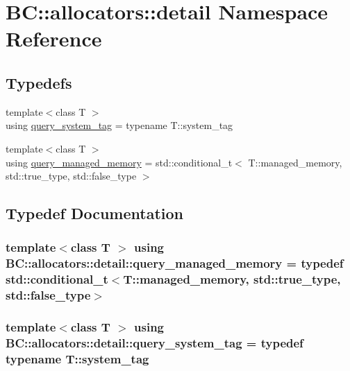 \hypertarget{namespaceBC_1_1allocators_1_1detail}{}\section{BC\+:\+:allocators\+:\+:detail Namespace Reference}
\label{namespaceBC_1_1allocators_1_1detail}
\subsection*{Typedefs}
\begin{DoxyCompactItemize}
\item 
{\footnotesize template$<$class T $>$ }\\using \hyperlink{namespaceBC_1_1allocators_1_1detail_a3443ef6fdbe2c417651fec71fa98dda8}{query\+\_\+system\+\_\+tag} = typename T\+::system\+\_\+tag
\item 
{\footnotesize template$<$class T $>$ }\\using \hyperlink{namespaceBC_1_1allocators_1_1detail_ad4bb4e071d1562e0209c47f8ebf8eade}{query\+\_\+managed\+\_\+memory} = std\+::conditional\+\_\+t$<$ T\+::managed\+\_\+memory, std\+::true\+\_\+type, std\+::false\+\_\+type $>$
\end{DoxyCompactItemize}


\subsection{Typedef Documentation}
\subsubsection[{\texorpdfstring{query\+\_\+managed\+\_\+memory}{query_managed_memory}}]{\setlength{\rightskip}{0pt plus 5cm}template$<$class T $>$ using {\bf B\+C\+::allocators\+::detail\+::query\+\_\+managed\+\_\+memory} = typedef std\+::conditional\+\_\+t$<$T\+::managed\+\_\+memory, std\+::true\+\_\+type, std\+::false\+\_\+type$>$}\hypertarget{namespaceBC_1_1allocators_1_1detail_ad4bb4e071d1562e0209c47f8ebf8eade}{}\label{namespaceBC_1_1allocators_1_1detail_ad4bb4e071d1562e0209c47f8ebf8eade}
\subsubsection[{\texorpdfstring{query\+\_\+system\+\_\+tag}{query_system_tag}}]{\setlength{\rightskip}{0pt plus 5cm}template$<$class T $>$ using {\bf B\+C\+::allocators\+::detail\+::query\+\_\+system\+\_\+tag} = typedef typename T\+::system\+\_\+tag}\hypertarget{namespaceBC_1_1allocators_1_1detail_a3443ef6fdbe2c417651fec71fa98dda8}{}\label{namespaceBC_1_1allocators_1_1detail_a3443ef6fdbe2c417651fec71fa98dda8}
